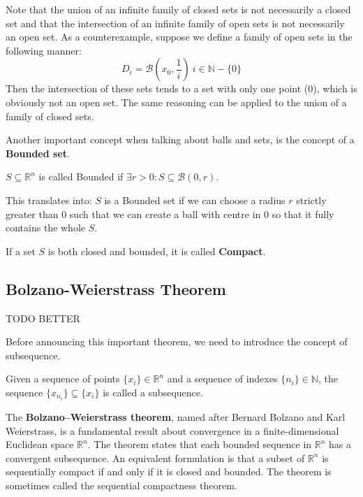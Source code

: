Note that the union of an infinite family of closed sets is not necessarily a closed set and that the intersection of an infinite family of open sets is not necessarily an open set. As a counterexample, suppose we define a family of open sets in the following manner:
\begin{equation}
    D_i = \mathcal{B}(x_0, \frac{1}{i})\ i \in \mathbb{N}-\{0\}
\end{equation}
Then the intersection of these sets tends to a set with only one point (0), which is obviously not an open set. The same reasoning can be applied to the union of a family of closed sets.
\par Another important concept when talking about balls and sets, is the concept of a \textbf{Bounded set}.
\begin{definition}
    $S \subseteq \mathbb{R}^n$ is called Bounded if $\exists r > 0 : S \subseteq \mathcal{B}(0,r)$.
\end{definition}
This translates into: $S$ is a Bounded set if we can choose a radius $r$ strictly greater than 0 such that we can create a ball with centre in 0 so that it fully contains the whole $S$.
\begin{definition}
    If a set $S$ is both closed and bounded, it is called \textbf{Compact}.
\end{definition}
%
\subsection{Bolzano-Weierstrass Theorem}
TODO BETTER
\par Before announcing this important theorem, we need to introduce the concept of subsequence.
\begin{definition}
    Given a sequence of points $\{x_i\} \in \mathbb{R}^n$ and a sequence of indexes $\{n_i\} \in \mathbb{N}$, the sequence $\{x_{n_i}\} \subseteq \{x_i\}$ is called a subsequence.
\end{definition}
The \textbf{Bolzano–Weierstrass theorem}, named after Bernard Bolzano and Karl Weierstrass, is a fundamental result about convergence in a finite-dimensional Euclidean space $\mathbb{R}^n$. The theorem states that each bounded sequence in $\mathbb{R}^n$ has a convergent subsequence. An equivalent formulation is that a subset of $\mathbb{R}^n$ is sequentially compact if and only if it is closed and bounded. The theorem is sometimes called the sequential compactness theorem.
%
